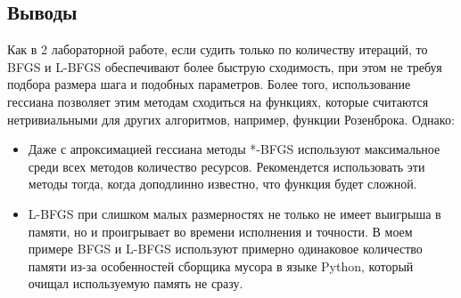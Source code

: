 \documentclass[a4paper,14pt,oneside,openany]{memoir}
\begin{document}
	
		
	\subsection{Выводы}  
	Как в 2 лабораторной работе, если судить только по количеству итераций, то BFGS и L-BFGS обеспечивают более быструю сходимость, при этом не требуя подбора размера шага и подобных параметров. Более того, использование гессиана позволяет этим методам сходиться на функциях, которые считаются нетривиальными для других алгоритмов, например, функции Розенброка. Однако: 
	\begin{itemize} 
		\item Даже с апроксимацией гессиана методы *-BFGS используют максимальное среди всех методов количество ресурсов. Рекомендется использовать эти методы тогда, когда доподлинно известно, что функция будет сложной.
		\item L-BFGS при слишком малых размерностях не только не имеет выигрыша в памяти, но и проигрывает во времени исполнения и точности. В моем примере BFGS и L-BFGS используют примерно одинаковое количество памяти из-за особенностей сборщика мусора в языке Python, который очищал используемую память не сразу.
	\end{itemize}
	
\end{document}
